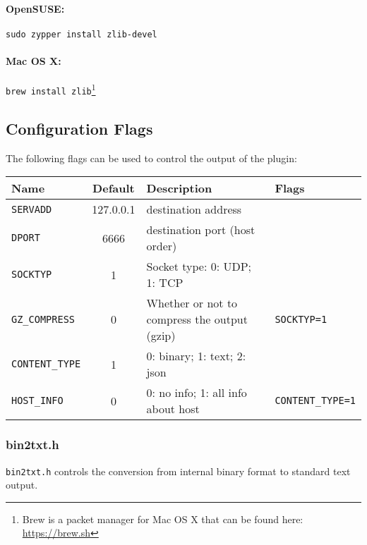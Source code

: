 \documentclass[documentation]{subfiles}
\begin{document}
\paragraph{OpenSUSE:} {\tt sudo zypper install zlib-devel}
\paragraph{Mac OS X:} {\tt brew install zlib}\footnote{Brew is a packet manager for Mac OS X that can be found here: \url{https://brew.sh}}

\subsection{Configuration Flags}
The following flags can be used to control the output of the plugin:

\begin{longtable}{lcll}
    \toprule
    {\bf Name} & {\bf Default} & {\bf Description} & {\bf Flags}\\
    \midrule\endhead%
    {\tt SERVADD}       & 127.0.0.1 & destination address \\
    {\tt DPORT}         & 6666      & destination port (host order)\\
    {\tt SOCKTYP}       & 1         & Socket type: 0: UDP; 1: TCP \\
    {\tt GZ\_COMPRESS}  & 0         & Whether or not to compress the output (gzip) & {\tt SOCKTYP=1}\\
    {\tt CONTENT\_TYPE} & 1         & 0: binary; 1: text; 2: json \\
    {\tt HOST\_INFO}    & 0         & 0: no info; 1: all info about host & {\tt CONTENT\_TYPE=1}\\
    \bottomrule
\end{longtable}

\subsubsection{bin2txt.h}
{\tt bin2txt.h} controls the conversion from internal binary format to standard text output.
\end{document}
